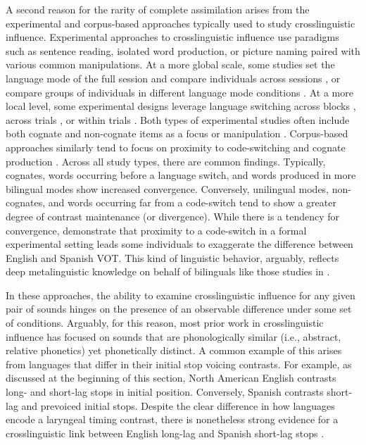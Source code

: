 A second reason for the rarity of complete assimilation arises from the experimental and corpus-based approaches typically used to study crosslinguistic influence. Experimental approaches to crosslinguistic influence use paradigms such as sentence reading, isolated word production, or picture naming paired with various common manipulations. At a more global scale, some studies set the language mode of the full session and compare individuals across sessions \citep{grosjean_2011_transfer, simonet_2019_convergence, sancier_1997_drift}, or compare groups of individuals in different language mode conditions \citep{antoniou_2010_context}. At a more local level, some experimental designs leverage language switching across blocks \citep{sundara_2006_production}, across trials \citep{goldrick_2014_switching}, or within trials \citep[i.e., prompted code-switching][]{bullock_2009_sociophonetics, antoniou_2011_VOT, olson_2016_transfer}. Both types of experimental studies often include both cognate and non-cognate items as a focus or manipulation \citep[e.g.,][]{goldrick_2014_switching}. Corpus-based approaches similarly tend to focus on proximity to code-switching \citep{fricke_2016_phonetic, balukas_2015_vot} and cognate production \citep{brown_2015_finegrained}. Across all study types, there are common findings. Typically, cognates, words occurring before a language switch, and words produced in more bilingual modes show increased convergence. Conversely, unilingual modes, non-cognates, and words occurring far from a code-switch tend to show a greater degree of contrast maintenance (or divergence). While there is a tendency for convergence, \citet{bullock_2009_sociophonetics} demonstrate that proximity to a code-switch in a formal experimental setting leads some individuals to exaggerate the difference between English and Spanish VOT. This kind of linguistic behavior, arguably, reflects deep metalinguistic knowledge on behalf of bilinguals like those studies in \citet{bullock_2009_sociophonetics}.

In these approaches, the ability to examine crosslinguistic influence for any given pair of sounds hinges on the presence of an observable difference under some set of conditions. Arguably, for this reason, most prior work in crosslinguistic influence has focused on sounds that are phonologically similar (i.e., abstract, relative phonetics) yet phonetically distinct. A common example of this arises from languages that differ in their initial stop voicing contrasts. For example, as discussed at the beginning of this section, North American English contrasts long- and short-lag stops in initial position. Conversely, Spanish contrasts short-lag and prevoiced initial stops. Despite the clear difference in how languages encode a laryngeal timing contrast, there is nonetheless strong evidence for a crosslinguistic link between English long-lag and Spanish short-lag stops \citep{casillas_2021_interlingual, fricke_2016_phonetic, goldrick_2014_switching, bullock_2009_sociophonetics, olson_2016_transfer}. 

